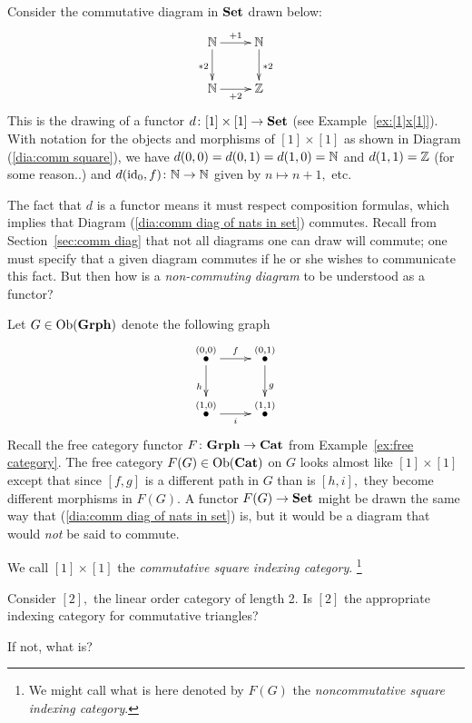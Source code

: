 \documentclass[CT4S-EN-RU]{subfiles}
\begin{document}
\begin{exampleENG}\label{ex:comm vs noncomm diags}
Consider the commutative diagram in ${\mathbf{Set}}$ drawn below:
\begin{align}\label{dia:comm diag of nats in set}
\xymatrix{\NN\ar[r]^{+1}\ar[d]_{*2}&\NN\ar[d]^{*2}\\\NN\ar[r]_{+2}&\ZZ}
\end{align}
This is the drawing of a functor $d\colon[1]\times[1]\rightarrow{\mathbf{Set}}$ (see Example~\ref{ex:[1]x[1]}). With notation for the objects and morphisms of $[1]\times[1]$ as shown in Diagram (\ref{dia:comm square}), we have $d(0,0)=d(0,1)=d(1,0)={\mathbb N}$ and $d(1,1)={\mathbb Z}$ (for some reason..) and $d(\textnormal{id}_0,f)\colon{\mathbb N}\rightarrow{\mathbb N}$ given by $n\mapsto n+1,$ etc. 

The fact that $d$ is a functor means it must respect composition formulas, which implies that Diagram (\ref{dia:comm diag of nats in set}) commutes. Recall from Section~\ref{sec:comm diag} that not all diagrams one can draw will commute; one must specify that a given diagram commutes if he or she wishes to communicate this fact. But then how is a {\em non-commuting diagram} to be understood as a functor?

Let $G\in\textnormal{Ob}({\mathbf{Grph}})$ denote the following graph 
$$\xymatrix{\LMO{(0,0)}\ar[r]^f\ar[d]_h&\LMO{(0,1)}\ar[d]^{g}\\\LMO{(1,0)}\ar[r]_{i}&\LMO{(1,1)}}$$
Recall the free category functor $F\colon{\mathbf{Grph}}\rightarrow{\mathbf{Cat}}$ from Example~\ref{ex:free category}. The free category $F(G)\in\textnormal{Ob}({\mathbf{Cat}})$ on $G$ looks almost like $[1]\times[1]$ except that since $[f,g]$ is a different path in $G$ than is $[h,i],$ they become different morphisms in $F(G).$ A functor $F(G)\rightarrow{\mathbf{Set}}$ might be drawn the same way that (\ref{dia:comm diag of nats in set}) is, but it would be a diagram that would {\em not} be said to commute.

We call $[1]\times [1]$ the {\em commutative square indexing category}. 
\footnote{We might call what is here denoted by $F(G)$ the {\em noncommutative square indexing category}.}
\end{exampleENG}

\begin{exampleRUS}\label{ex:comm vs noncomm diags}
\end{exampleRUS}

\begin{exerciseENG}
Consider $[2],$ the linear order category of length 2.
\sexc Is $[2]$ the appropriate indexing category for commutative triangles?
\item If not, what is?
\endsexc
\end{exerciseENG}
\end{document}

